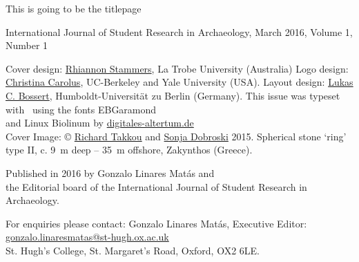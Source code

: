 	\begin{titlepage}
		
		This is going to be the titlepage
	\end{titlepage}	
\thispagestyle{empty}
\hfill
\vfill

\begin{footnotesize}
\noindent International Journal of Student Research in Archaeology,\newline
March 2016, Volume 1, Number 1\\
\vspace{2em}


\noindent Cover design: \href{https://latrobe.academia.edu/RhiannonStammers}{Rhiannon Stammers}, La Trobe University (Australia)\newline
\noindent Logo design: \href{hraf.yale.edu/about/staff/christina-carolus/}{Christina Carolus}, UC-Berkeley and Yale University (USA).\newline
\noindent Layout design: \href{https://hu-berlin.academia.edu/LukasCBossert}{Lukas C. Bossert}, Humboldt-Universität zu Berlin (Germany). \newline \indent This issue was typeset with \XeLaTeX\ using the fonts EBGaramond\\ \indent and {\sffamily Linux Biolinum} by \href{www.digitales-altertum.de}{digitales-altertum.de} \\
Cover Image: © \href{https://oxford.academia.edu/RichardTakkou}{Richard Takkou} and \href{https://st-andrews.academia.edu/SonjaDobroski}{Sonja Dobroski} 2015.\newline
\indent Spherical stone ‘ring’ type II, c. \SI{9}{\meter} deep – \SI{35}{\meter} offshore, Zakynthos (Greece). 
\vspace{2em}

\noindent Published in 2016 by Gonzalo Linares Matás and \\ the Editorial board of the International Journal of Student Research in Archaeology. 




\vspace{2em}






\noindent For enquiries please contact: Gonzalo Linares Matás, Executive Editor:\\ \href{mailto:gonzalo.linaresmatas@st-hugh.ox.ac.uk}{gonzalo.linaresmatas@st-hugh.ox.ac.uk}\\  St. Hugh’s College, St. Margaret’s Road, Oxford, OX2 6LE.


\end{footnotesize}
